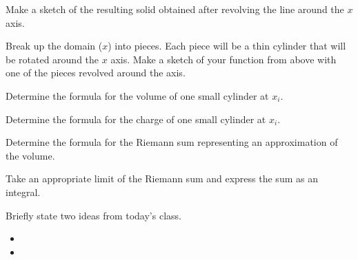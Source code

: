 \begin{problem}
\begin{subproblem}
       \item Make a sketch of the resulting solid obtained after
         revolving the line around the $x$ axis.
         \vfill

       \item Break up the domain ($x$) into pieces. Each piece will be a thin cylinder that will be rotated around the $x$ axis.
            Make a sketch of your function from above with one of the pieces revolved around the axis.
         \vfill

       \clearpage

       \item Determine the formula for the volume of one small cylinder at $x_i$.
         \vfill

       \item Determine the formula for the charge of one small cylinder at $x_i$.
         \vfill

       \item Determine the formula for the Riemann sum representing an approximation of the volume.
         \vfill

       \item Take an appropriate limit of the Riemann sum and express the sum as an integral.
         \vfill

     \end{subproblem}

\end{problem}

\postClass

\begin{problem}
\item Briefly state two ideas from today's class.
  \begin{itemize}
  \item
  \item
  \end{itemize}
\item
  \begin{subproblem}
    \item
  \end{subproblem}
\end{problem}



